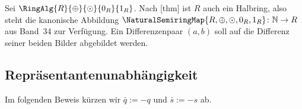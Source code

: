 \documentclass[main.tex]{subfiles}
\begin{document}
Sei \(\RingAlg{R}{\oplus}{\odot}{0_R}{1_R}\). Nach
[thm] ist \(R\) auch ein Halbring,
also steht die kanonische Abbildung
\(\NaturalSemiringMap{R,\oplus,\odot,0_R,1_R}\colon\mathbb N\to R\)
aus Band~34 zur Verfügung. Ein Differenzenpaar \((a,b)\) soll auf die
Differenz seiner beiden Bilder abgebildet werden.

\subsection{Repräsentantenunabhängigkeit}

Im folgenden Beweis kürzen wir
\(\bar q:=-q\) und \(\bar s:=-s\) ab.
\end{document}
